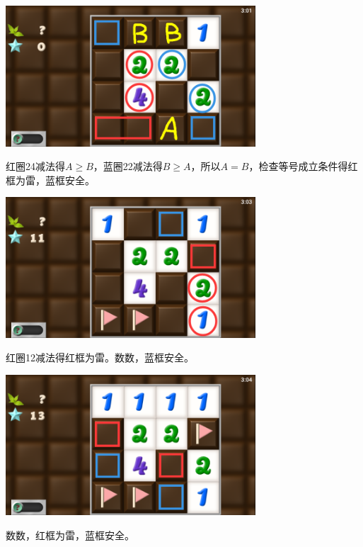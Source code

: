 \subsection{} %
\begin{center}
    \includegraphics[width=0.7\textwidth]{puzzle/153-1.png}
\end{center}
红圈24减法得$A\ge B$，蓝圈22减法得$B\ge A$，所以$A=B$，检查等号成立条件得红框为雷，蓝框安全。
\begin{center}
    \includegraphics[width=0.7\textwidth]{puzzle/153-2.png}
\end{center}
红圈12减法得红框为雷。数数，蓝框安全。
\begin{center}
    \includegraphics[width=0.7\textwidth]{puzzle/153-3.png}
\end{center}
数数，红框为雷，蓝框安全。

